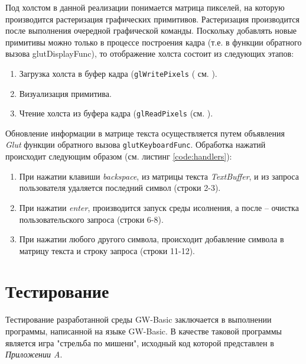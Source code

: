 \documentclass[12pt]{article}
\begin{document}
			\indent Под холстом в данной реализации понимается матрица пикселей, на которую производится растеризация графических примитивов. Растеризация производится после выполнения очередной графической команды. Поскольку добавлять новые примитивы можно только в процессе построения кадра (т.е. в функции обратного вызова glutDisplayFunc), то отображение холста состоит из следующих этапов:
			\begin{enumerate}
				\item Загрузка холста в буфер кадра ({\tt glWritePixels} ( см. \cite{glManual}).
				\item Визуализация примитива.
				\item Чтение холста из буфера кадра ({\tt glReadPixels} (см. \cite{glManual}).
			\end{enumerate} 

			\indent Обновление информации в матрице текста осуществляется путем объявления {\it Glut} функции обратного вызова {\tt glutKeyboardFunc}. Обработка нажатий происходит следующим образом (см. листинг \ref{code:handlers}):
			\begin{enumerate}
				\item При нажатии клавиши {\it backspace}, из матрицы текста {\it TextBuffer}, и из запроса пользователя удаляется последний символ (строки 2-3).
				\item При нажатии {\it enter}, производится запуск среды исолнения, а после -- очистка пользовательского запроса (строки 6-8).
				\item При нажатии любого другого символа, происходит добавление символа в матрицу текста и строку запроса (строки 11-12).
			\end{enumerate}
			
				
	\newpage
	\section{Тестирование}
		\hspace{\parindent} Тестирование разработанной среды GW-Basic заключается в выполнении программы, написанной на языке GW-Basic. В качестве таковой программы является игра "стрельба по мишени", исходный код которой представлен в {\it Приложении A}.
		
\end{document}
